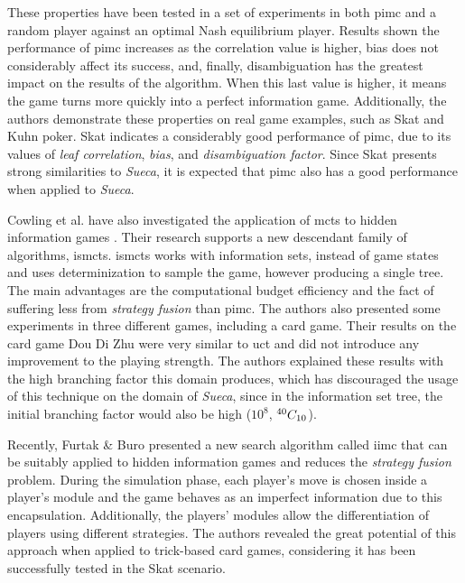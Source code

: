 These properties have been tested in a set of experiments in both \gls{pimc} and a random player against an optimal Nash equilibrium player.
Results shown the performance of \gls{pimc} increases as the correlation value is higher, bias does not considerably affect its success, and, finally, disambiguation has the greatest impact on the results of the algorithm.
When this last value is higher, it means the game turns more quickly into a perfect information game.
Additionally, the authors demonstrate these properties on real game examples, such as Skat and Kuhn poker.
Skat indicates a considerably good performance of \gls{pimc}, due to its values of \emph{leaf correlation}, \emph{bias}, and \emph{disambiguation factor}.
Since Skat presents strong similarities to \emph{Sueca}, it is expected that \gls{pimc} also has a good performance when applied to \emph{Sueca}.


Cowling et al. have also investigated the application of \gls{mcts} to hidden information games \cite{Cowling2012}.
Their research supports a new descendant family of algorithms, \gls{ismcts}.
\gls{ismcts} works with information sets, instead of game states and uses determinization to sample the game, however producing a single tree.
The main advantages are the computational budget efficiency and the fact of suffering less from \emph{strategy fusion} than \gls{pimc}.
The authors also presented some experiments in three different games, including a card game.
Their results on the card game Dou Di Zhu were very similar to \gls{uct} and did not introduce any improvement to the playing strength.
The authors explained these results with the high branching factor this domain produces, which has discouraged the usage of this technique on the domain of \emph{Sueca}, since in the information set tree, the initial branching factor would also be high ($10^{8}$, ${}^{40}C_{10}$).


Recently, Furtak \& Buro \cite{Furtak} presented a new search algorithm called \gls{iimc} that can be suitably applied to hidden information games and reduces the \emph{strategy fusion} problem.
During the simulation phase, each player's move is chosen inside a player's module and the game behaves as an imperfect information due to this encapsulation.
Additionally, the players' modules allow the differentiation of players using different strategies.
The authors revealed the great potential of this approach when applied to trick-based card games, considering it has been successfully tested in the Skat scenario.


